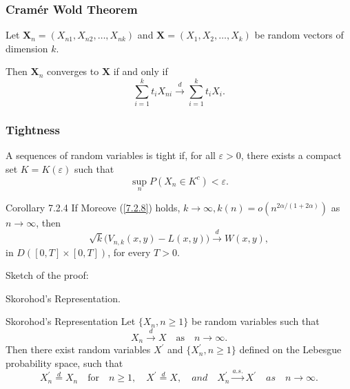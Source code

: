 \documentclass[11pt]{beamer}
\begin{document}
\begin{frame}
	\frametitle{Cram\'er Wold Theorem}
Let $\boldsymbol{X}_n=(X_{n1},X_{n2},\dots,X_{nk})$
and $\boldsymbol{X}=(X_1,X_2,\dots,X_k)$ be random vectors of dimension $k$.

\bigskip

Then $\boldsymbol{X}_n$ converges  to $\boldsymbol{X}$ if and only if 
$$
\sum_{i=1}^k t_i X_{ni}\stackrel{d}{\to} \sum_{i=1}^k t_i X_{i}.
$$

\end{frame}


\begin{frame}
	\frametitle{Tightness}
	A sequences of random variables is tight if, for all $\varepsilon>0$, there exists a compact set $K=K(\varepsilon)$ such that 
	$$
\sup_n P(X_n\in K^c)< \varepsilon.
	$$

	

\end{frame}


\begin{frame}{Corollary 7.2.4}
If Moreove (\ref{7.2.8}) holds, $k\to \infty, k(n)=o(n^{2\alpha/(1+2\alpha)})$ as $n \to \infty$, then
\begin{displaymath}
\sqrt{k}\big (V_{n,k}(x,y)-L(x,y)\big)\stackrel{d}{\to } W(x,y),
\end{displaymath}
in $D([0,T]\times [0,T])$, for every $T>0$.\par 
\vspace{2ex}
Sketch of the proof:\par 
\quad Skorohod's Representation.

\end{frame}



\begin{frame}{Skorohod's Representation}
	Let $\{X_n, n\ge 1\}$ be random variables such that 
	\begin{displaymath}
	X_n \stackrel{d}{\to} X \quad \text{as}\quad  n \to \infty.
	\end{displaymath} 
	Then there exist random variables $X^{'}$ and $\{X_n^{'}, n\ge 1\}$ defined on the Lebesgue
	probability space, such that
	\begin{displaymath}
	X_n^{'}\stackrel{d}{=} X_n \quad \text{for} \quad n \ge 1 ,\quad  X^{'}\stackrel{d}{=}X, \quad and \quad X_n^{'}\stackrel{a.s.}{\to}X^{'} \quad 	as \quad n \to \infty.
	\end{displaymath}
\end{frame}
\end{document}

